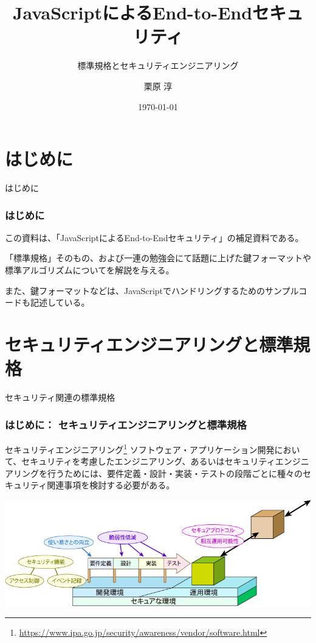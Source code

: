 \documentclass[12pt,dvipdfmx]{beamer}
\title[E2E Security with JS Appendix]{JavaScriptによるEnd-to-Endセキュリティ}
\subtitle{標準規格とセキュリティエンジニアリング}
\author[Jun Kurihara]{栗原 淳}
\institute[]{}
\date[\today]{\today}
\begin{document}
\begin{frame}
\titlepage
\end{frame}

\section{はじめに}
\begin{frame}
 \centering
 {\Large はじめに}
\end{frame}

\begin{frame}
\frametitle{はじめに}
この資料は、「JavaScriptによるEnd-to-Endセキュリティ」の補足資料である。

「標準規格」そのもの、および一連の勉強会にて話題に上げた鍵フォーマットや標準アルゴリズムについてを解説を与える。

また、鍵フォーマットなどは、JavaScriptでハンドリングするためのサンプルコードも記述している。
\end{frame}

\section{セキュリティエンジニアリングと標準規格}
\begin{frame}
\centering
 {\Large セキュリティ関連の標準規格}
\end{frame}

\begin{frame}
\frametitle{はじめに： セキュリティエンジニアリングと標準規格}
\begin{block}{セキュリティエンジニアリング\footnote[frame]{\scriptsize \url{https://www.ipa.go.jp/security/awareness/vendor/software.html}} }
ソフトウェア・アプリケーション開発において、セキュリティを考慮したエンジニアリング、あるいはセキュリティエンジニアリングを行うためには、要件定義・設計・実装・テストの段階ごとに種々のセキュリティ関連事項を検討する必要がある。
\end{block}
\begin{center}
\includegraphics[width=0.8\linewidth]{FigsAppendix/security-eng-2.png}
\end{center}
\end{frame}
\end{document}
